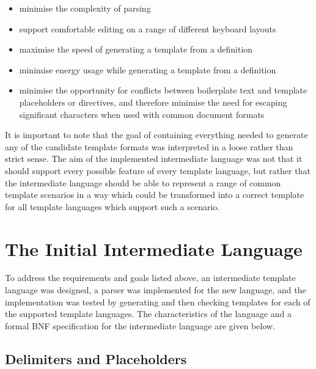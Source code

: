 \begin{itemize}
    \item minimise the complexity of parsing
    \item support comfortable editing on a range of different keyboard layouts
    \item maximise the speed of generating a template from a definition
    \item minimise energy usage while generating a template from a definition
    \item minimise the opportunity for conflicts between boilerplate text and template placeholders or directives, and therefore minimise the need for escaping significant characters when used with common document formats
\end{itemize}

It is important to note that the goal of containing everything needed to generate any of the candidate template formats was interpreted in a loose rather than strict sense. The aim of the implemented intermediate language was not that it should support every possible feature of every template language, but rather that the intermediate language should be able to represent a range of common template scenarios in a way which could be transformed into a correct template for all template languages which support such a scenario.

\section*{The Initial Intermediate Language}
\label{gilt:language}

To address the requirements and goals listed above, an intermediate template language was designed, a parser was implemented for the new language, and the implementation was tested by generating and then checking templates for each of the supported template languages. The characteristics of the language and a formal BNF specification for the intermediate language are given below.

\subsection*{Delimiters and Placeholders}
\label{gilt:delimiters}

